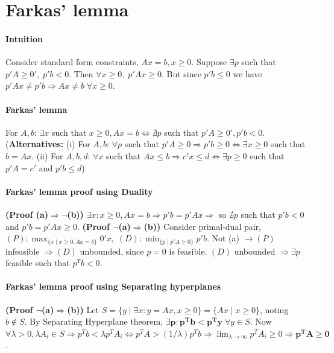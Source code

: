 \documentclass{article}
\begin{document}
\section{Farkas' lemma}
\paragraph{Intuition} Consider standard form constraints, $Ax = b, x\geq 0$. Suppose $\exists p$ such that $p'A \geq 0',\; p'b < 0$. Then $\forall x \geq 0,\; p'Ax \geq 0$. But since $p'b \leq 0$ we have $p'Ax \neq p'b \Rightarrow Ax \neq b \; \forall x\geq 0$. 
\paragraph{Farkas' lemma } For $A, b$: $\exists x$ such that $x\geq 0, Ax = b \iff \nexists p$ such that $p'A \geq 0', p'b < 0$. (\textbf{Alternatives:} (i) For $A,b$: $\forall p$ such that $p'A\geq 0 \Rightarrow p'b \geq 0 \iff \exists x\geq 0$ such that $b = Ax$. (ii) For $A, b, d$: $\forall x$ such that $Ax\leq b \Rightarrow c'x \leq d \iff \exists p\geq 0$ such that $p'A = c'$ and $p'b \leq d$)

\paragraph{Farkas' lemma proof using Duality} 
\textbf{(Proof (a)$\Rightarrow \neg$(b))} $\exists x: x\geq 0, Ax = b \Rightarrow p'b = p'Ax \Rightarrow$ so $\nexists p$ such that $p'b < 0$ and $p'b = p'Ax \geq 0$.
\textbf{(Proof $\neg$(a)$\Rightarrow$(b))} Consider primal-dual pair, $(P):\max_{\{x\mid x\geq 0, Ax=b\}}0'x,\; (D): \min_{\{p\mid p'A\geq 0\}}p'b$. Not (a) $\rightarrow (P)$ infeasible $\Rightarrow (D)$ unbounded, since $p = 0$ is feasible. $(D)$ unbounded $\Rightarrow \exists p$ feasible such that $p^Tb < 0$. 

\paragraph{Farkas' lemma proof using Separating hyperplanes}
\textbf{(Proof $\neg$(a)$\Rightarrow$(b))} Let $S = \{y \mid \exists x : y = Ax, x\geq 0\} = \{Ax \mid x \geq 0\}$, noting $b \notin S$. By Separating Hyperplane theorem, $\mathbf{\exists p: p^Tb < p^Ty} \; \forall y\in S$. Now $\forall \lambda > 0, \lambda A_i \in S \Longrightarrow p^Tb < \lambda p^TA_i \iff p^TA > (1/\lambda) p^Tb \Rightarrow \lim_{\lambda \rightarrow \infty} p^TA_i \geq 0 \Rightarrow \mathbf{p^TA \geq 0}$. 
\end{document}
